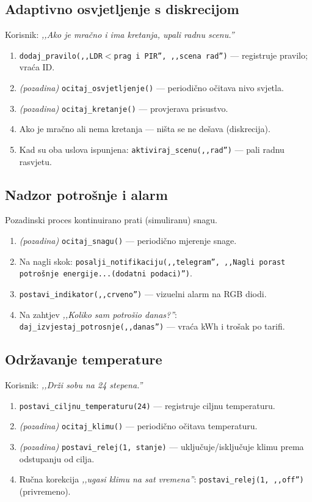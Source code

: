 \documentclass[11pt,a4paper]{article}
\begin{document}
\subsection{Adaptivno osvjetljenje s diskrecijom}
Korisnik: \emph{,,Ako je mračno i ima kretanja, upali radnu scenu.''}
\begin{enumerate}[nosep]
      \item \texttt{dodaj\_pravilo(,,LDR$<$prag i PIR'', ,,scena rad'')} --- registruje
            pravilo; vraća ID.
      \item \emph{(pozadina)} \texttt{ocitaj\_osvjetljenje()} --- periodično očitava nivo
            svjetla.
      \item \emph{(pozadina)} \texttt{ocitaj\_kretanje()} --- provjerava prisustvo.
      \item Ako je mračno ali nema kretanja --- ništa se ne dešava (diskrecija).
      \item Kad su oba uslova ispunjena: \texttt{aktiviraj\_scenu(,,rad'')} --- pali radnu
            rasvjetu.
\end{enumerate}

\subsection{Nadzor potrošnje i alarm}
Pozadinski proces kontinuirano prati (simuliranu) snagu.
\begin{enumerate}[nosep]
      \item \emph{(pozadina)} \texttt{ocitaj\_snagu()} --- periodično mjerenje snage.
      \item Na nagli skok: \texttt{posalji\_notifikaciju(,,telegram'', ,,Nagli porast potrošnje energije...(dodatni podaci)'')}.
      \item \texttt{postavi\_indikator(,,crveno'')} --- vizuelni alarm na RGB diodi.
      \item Na zahtjev \emph{,,Koliko sam potrošio danas?''}:
            \texttt{daj\_izvjestaj\_potrosnje(,,danas'')} --- vraća kWh i trošak po tarifi.
\end{enumerate}

\subsection{Održavanje temperature}
Korisnik: \emph{,,Drži sobu na 24 stepena.''}
\begin{enumerate}[nosep]
      \item \texttt{postavi\_ciljnu\_temperaturu(24)} --- registruje ciljnu temperaturu.
      \item \emph{(pozadina)} \texttt{ocitaj\_klimu()} --- periodično očitava temperaturu.
      \item \emph{(pozadina)} \texttt{postavi\_relej(1, stanje)} --- uključuje/isključuje
            klimu prema odstupanju od cilja.
      \item Ručna korekcija \emph{,,ugasi klimu na sat vremena''}:
            \texttt{postavi\_relej(1, ,,off'')} (privremeno).
\end{enumerate}
\end{document}
